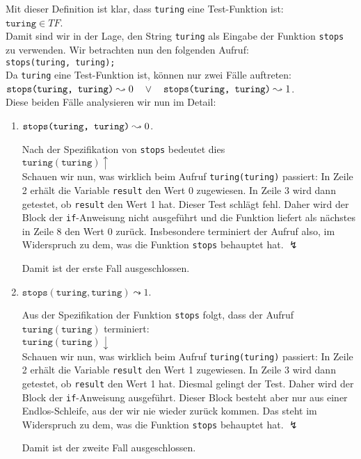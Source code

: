 Mit dieser Definition ist klar, dass \texttt{turing} eine Test-Funktion ist: \\[0.3cm]
\hspace*{1.3cm} $\texttt{turing} \in T\!F$. \\[0.3cm]
Damit sind wir in der Lage, den String \texttt{turing} als Eingabe der Funktion \texttt{stops}
zu verwenden.  Wir betrachten nun den folgenden Aufruf: \\[0.3cm]
\hspace*{1.3cm} \texttt{stops(\texttt{turing}, \texttt{turing});} \\[0.3cm]
Da \texttt{turing} eine Test-Funktion ist, können nur zwei Fälle auftreten:
\\[0.1cm]
\hspace*{1.3cm} 
$\texttt{stops(\texttt{turing}, \texttt{turing})} \leadsto 0 \quad \vee\quad
 \texttt{stops(\texttt{turing}, \texttt{turing})} \leadsto 1$. \\[0.1cm]
Diese beiden Fälle analysieren wir nun im Detail:
\begin{enumerate}
\item $\texttt{stops(\texttt{turing}, \texttt{turing})} \leadsto 0$. 

      Nach der Spezifikation von \texttt{stops} bedeutet dies \\[0.1cm]
      \hspace*{1.3cm} $\texttt{turing}(\texttt{turing}) \uparrow$ \\[0.1cm]
      Schauen wir nun, was wirklich beim Aufruf \texttt{turing(\texttt{turing})} passiert:
      In Zeile 2 erhält die Variable \texttt{result} den Wert 0 zugewiesen.  In Zeile 3
      wird dann getestet, ob \texttt{result} den Wert 1 hat.  Dieser Test schlägt fehl.
      Daher wird der Block der \texttt{if}-Anweisung nicht ausgeführt und die Funktion liefert als
      nächstes in Zeile 8 den Wert 0 zurück.  Insbesondere terminiert der Aufruf also, im
      Widerspruch zu dem, was die Funktion \texttt{stops} behauptet hat. $\lightning$

      Damit ist der erste Fall ausgeschlossen.
\item  $\mathtt{stops}(\texttt{turing}, \texttt{turing}) \leadsto 1$. 

      Aus der Spezifikation der Funktion \texttt{stops} folgt, dass der Aufruf
      $\texttt{turing}(\texttt{turing})$ terminiert: \\[0.1cm]
      \hspace*{1.3cm} $\mathtt{turing}(\texttt{turing}) \downarrow$ \\[0.1cm]
      Schauen wir nun, was wirklich beim Aufruf \texttt{turing(\texttt{turing})} passiert:
      In Zeile 2 erhält die Variable \texttt{result} den Wert 1 zugewiesen.  In Zeile 3
      wird dann getestet, ob \texttt{result} den Wert 1 hat.  Diesmal gelingt der Test.
      Daher wird der Block der \texttt{if}-Anweisung ausgeführt.  Dieser Block
      besteht aber nur aus einer Endlos-Schleife, aus der wir nie wieder zurück kommen.
      Das steht im Widerspruch zu dem, was die Funktion \texttt{stops} behauptet hat.
      $\lightning$

      Damit ist der zweite Fall ausgeschlossen.
\end{enumerate}
